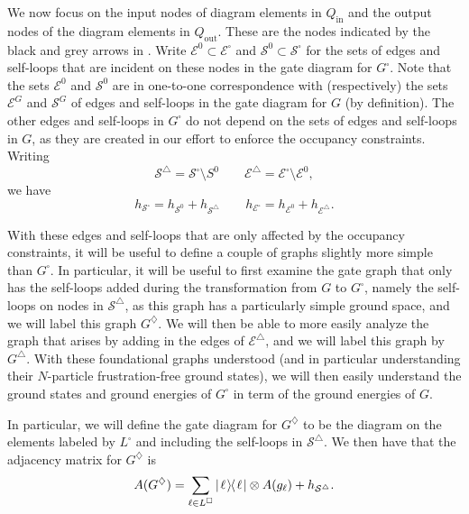 \documentclass[../thesis-main/thesis-main]{subfiles}
\begin{document}
We now focus on the input nodes of diagram elements in $Q_{\text{in}}$ and the output nodes of the diagram elements in $Q_{\text{out}}$. These are the nodes indicated by the black and grey arrows in . Write $\mathcal{E}^{0}\subset\mathcal{E}^{\square}$ and $\mathcal{S}^{0}\subset\mathcal{S^{\square}}$ for the sets of edges and self-loops that are incident on these nodes in the gate diagram for $G^{\square}$. Note that the sets $\mathcal{E}^{0}$ and $\mathcal{S}^{0}$ are in one-to-one correspondence with (respectively) the sets $\mathcal{E}^{G}$ and $\mathcal{S}^{G}$ of edges and self-loops in the gate diagram for $G$ (by definition). The other edges and self-loops in $G^{\square}$ do not depend on the sets of edges and self-loops in $G$, as they are created in our effort to enforce the occupancy constraints. Writing
\begin{equation}
\mathcal{S}^{\triangle}=\mathcal{S}^{\square}\setminus S^{0}\qquad\mathcal{E}^{\triangle}=\mathcal{E}^{\square}\setminus\mathcal{E}^{0},
\end{equation}
we have 
\begin{equation}
h_{\mathcal{S}^{\square}}=h_{\mathcal{S}^{0}}+h_{\mathcal{S}^{\triangle}}\qquad h_{\mathcal{E}^{\square}}=h_{\mathcal{E}^{0}}+h_{\mathcal{E}^{\triangle}}.\label{eq:h_se_square}
\end{equation}

With these edges and self-loops that are only affected by the occupancy constraints, it will be useful to define a couple of graphs slightly more simple than $G^{\square}$.  In particular, it will be useful to first  examine the gate graph that only has the self-loops added during the transformation from $G$ to $G^{\square}$, namely the self-loops on nodes in $\mathcal{S}^{\triangle}$, as this graph has a particularly simple ground space, and we will label this graph $G^{\diamondsuit}$.  We will then be able to more easily analyze the graph that arises by adding in the edges of $\mathcal{E}^{\triangle}$, and we will label this graph by $G^{\triangle}$.  With these foundational graphs understood (and in particular understanding their $N$-particle frustration-free ground states), we will then easily understand the ground states and ground energies of $G^{\square}$ in term of the ground energies of $G$.

In particular, we will define the gate diagram for $G^{\diamondsuit}$ to be the diagram on the  elements labeled by $L^{\square}$ and including the self-loops in $\mathcal{S}^{\triangle}$.  We then have that the adjacency matrix for $G^{\diamondsuit}$ is 
\begin{equation}
  A(G^{\diamondsuit}) = \sum_{\ell \in L^{\square}} |\mspace{2mu} \ell \mspace{2mu} \rangle\mspace{-2mu}\langle\mspace{2mu} \ell \mspace{2mu} | \otimes A(g_\ell) + h_{\mathcal{S}^\triangle}\label{eq:A_G_diamond_defn}.
\end{equation}
\end{document}
